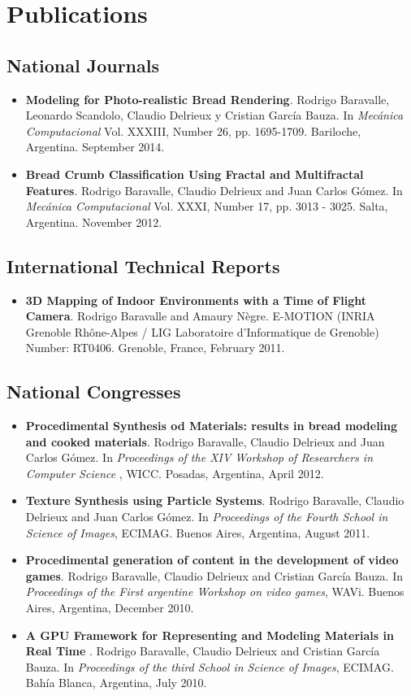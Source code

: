 \documentclass[a4paper,12pt]{article}
\begin{document}
\section*{Publications}
\subsection*{National Journals}

\begin{itemize}
\item {\bf Modeling for Photo-realistic Bread Rendering}. Rodrigo Baravalle, Leonardo Scandolo, Claudio Delrieux y Cristian García Bauza. In {\it Mecánica Computacional} Vol. XXXIII, Number 26, pp. 1695-1709. Bariloche, Argentina. September 2014.
\item {\bf Bread Crumb Classification Using Fractal and Multifractal Features}. Rodrigo Baravalle, Claudio Delrieux and Juan Carlos G\'omez. In {\it Mecánica Computacional} Vol. XXXI, Number 17, pp. 3013 - 3025. Salta, Argentina. November 2012.
\end{itemize}


\subsection*{International Technical Reports}
\begin{itemize}
\item {\bf 3D Mapping of Indoor Environments with a Time of Flight Camera}. Rodrigo Baravalle and Amaury N\`egre. E-MOTION (INRIA Grenoble Rh\^one-Alpes / LIG Laboratoire d'Informatique de Grenoble) Number: RT0406. Grenoble, France, February 2011.
\end{itemize}

\subsection*{National Congresses}
\begin{itemize}
\item {\bf Procedimental Synthesis od Materials: results in bread modeling and cooked materials}. Rodrigo Baravalle, Claudio Delrieux and Juan Carlos G\'omez. In {\it Proceedings of the XIV Workshop of Researchers in Computer Science }, WICC. Posadas, Argentina, April 2012.
\item {\bf Texture Synthesis using Particle Systems}. Rodrigo Baravalle, Claudio Delrieux and Juan Carlos G\'omez. In {\it Proceedings of the Fourth School in Science of Images}, ECIMAG. Buenos Aires, Argentina, August 2011.
\item {\bf Procedimental generation of content in the development of video games}. Rodrigo Baravalle, Claudio Delrieux and Cristian Garc\'ia Bauza. In {\it Proceedings of the First argentine Workshop on video games}, WAVi. Buenos Aires, Argentina, December 2010.
\item {\bf A GPU Framework for Representing and Modeling Materials in Real Time }. Rodrigo Baravalle, Claudio Delrieux and Cristian Garc\'ia Bauza. In {\it Proceedings of the third School in Science of Images}, ECIMAG. Bahía Blanca, Argentina, July 2010.
\end{itemize}
\end{document}
